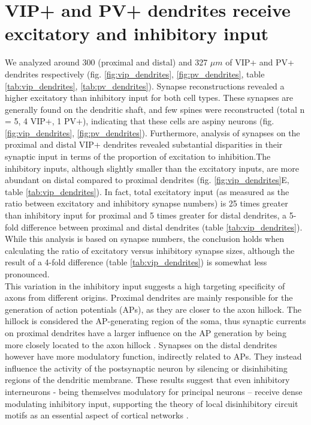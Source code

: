 \section{VIP+ and PV+ dendrites receive excitatory and inhibitory input}
We analyzed around 300 (proximal and distal) and 327 $\mu m$ of VIP+ and PV+ dendrites respectively (fig. \ref{fig:vip_dendrites}, \ref{fig:pv_dendrites}, table \ref{tab:vip_dendrites}, \ref{tab:pv_dendrites}). Synapse reconstructions revealed a higher excitatory than inhibitory input for both cell types. These synapses are generally found on the dendritic shaft, and few spines were reconstructed (total n = 5, 4 VIP+, 1 PV+), indicating that these cells are aspiny neurons (fig. \ref{fig:vip_dendrites}, \ref{fig:pv_dendrites}). Furthermore, analysis of synapses on the proximal and distal VIP+ dendrites revealed substantial disparities in their synaptic input in terms of the proportion of excitation to inhibition.The inhibitory inputs, although slightly smaller than the excitatory inputs, are more abundant on distal compared to proximal dendrites (fig. \ref{fig:vip_dendrites}E, table \ref{tab:vip_dendrites}). In fact, total excitatory input (as measured as the ratio between excitatory and inhibitory synapse numbers) is 25 times greater than inhibitory input for proximal and 5 times greater for distal dendrites, a 5-fold difference between proximal and distal dendrites (table \ref{tab:vip_dendrites}). While this analysis is based on synapse numbers, the conclusion holds when calculating the ratio of excitatory versus inhibitory synapse sizes, although the result of a 4-fold difference (table \ref{tab:vip_dendrites}) is somewhat less pronounced. \\
This variation in the inhibitory input suggests a high targeting specificity of axons from different origins. Proximal dendrites are mainly responsible for the generation of action potentials (APs), as they are closer to the axon hillock. The hillock is considered the AP-generating region of the soma, thus synaptic currents on proximal dendrites have a larger influence on the AP generation by being more closely located to the axon hillock \citep{Palay1968,Wollner1986, Haeusser2000}. Synapses on the distal dendrites however have more modulatory function, indirectly related to APs. They instead influence the activity of the postsynaptic neuron by silencing or disinhibiting regions of the dendritic membrane. These results suggest that even inhibitory interneurons - being themselves modulatory for principal neurons – receive dense modulating inhibitory input, supporting the theory of local disinhibitory circuit motifs as an essential aspect of cortical networks \citep{Pfeffer2013,Pfeffer2014}.
